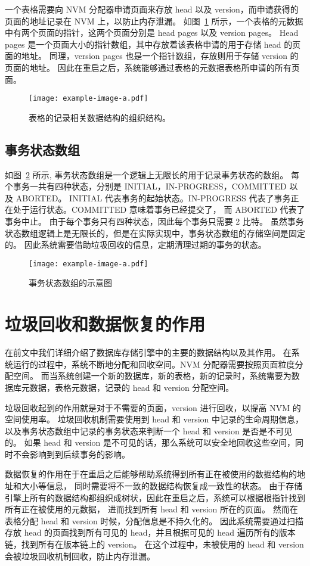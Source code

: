 一个表格需要向 NVM 分配器申请页面来存放 head 以及 version，而申请获得的页面的地址记录在 NVM 上，以防止内存泄漏。
如图~\ref{fig:table} 所示，一个表格的元数据中有两个页面的指针，这两个页面分别是 head pages 以及 version pages。
Head pages 是一个页面大小的指针数组，其中存放着该表格申请的用于存储 head 的页面的地址。
同理，version pages 也是一个指针数组，存放则用于存储 version 的页面的地址。
因此在重启之后，系统能够通过表格的元数据表格所申请的所有页面。

\begin{figure}
    \centering
    \texttt{[image: example-image-a.pdf]}
    \caption{表格的记录相关数据结构的组织结构。}
    \label{fig:table}
\end{figure}


\subsection{事务状态数组}
\label{ssec:clog}
如图~\ref{fig:clog} 所示, 事务状态数组是一个逻辑上无限长的用于记录事务状态的数组。
每个事务一共有四种状态，分别是 INITIAL，IN-PROGRESS，COMMITTED 以及 ABORTED。
INITIAL 代表事务的起始状态。IN-PROGRESS 代表了事务正在处于运行状态。COMMITTED 意味着事务已经提交了，
而 ABORTED 代表了事务中止。
由于每个事务只有四种状态，因此每个事务只需要 2 比特。
虽然事务状态数组逻辑上是无限长的，但是在实际实现中，事务状态数组的存储空间是固定的。
因此系统需要借助垃圾回收的信息，定期清理过期的事务的状态。

\begin{figure}
    \centering
    \texttt{[image: example-image-a.pdf]}
    \caption{事务状态数组的示意图}
    \label{fig:clog}
\end{figure}



\section{垃圾回收和数据恢复的作用}
\label{sec:gc_dr}

在前文中我们详细介绍了数据库存储引擎中的主要的数据结构以及其作用。
在系统运行的过程中，系统不断地分配和回收空间。NVM 分配器需要按照页面粒度分配空间。
而当系统创建一个新的数据库，新的表格，新的记录时，系统需要为数据库元数据，表格元数据，记录的 head 和 version 分配空间。

垃圾回收起到的作用就是对于不需要的页面，version 进行回收，以提高 NVM 的空间使用率。
垃圾回收机制需要使用到 head 和 version 中记录的生命周期信息，以及事务状态数组中记录的事务状态来判断一个 head 和 version 是否是不可见的。
如果 head 和 version 是不可见的话，那么系统可以安全地回收这些空间，同时不会影响到到后续事务的影响。

数据恢复的作用在于在重启之后能够帮助系统得到所有正在被使用的数据结构的地址和大小等信息，
同时需要将不一致的数据结构恢复成一致性的状态。
由于存储引擎上所有的数据结构都组织成树状，因此在重启之后，系统可以根据根指针找到所有正在被使用的元数据，
进而找到所有 head 和 version 所在的页面。
然而在表格分配 head 和 version 时候，分配信息是不持久化的。
因此系统需要通过扫描存放 head 的页面找到所有可见的 head，并且根据可见的 head 遍历所有的版本链，找到所有在版本链上的 version。
在这个过程中，未被使用的 head 和 version 会被垃圾回收机制回收，防止内存泄漏。